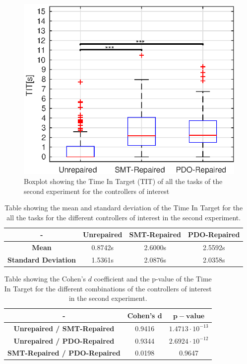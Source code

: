 \begin{figure}[H]
    \centering
    \includegraphics[width=\textwidth]{Images/second-experiment/exp1_TIT.eps}
    \caption{Boxplot showing the Time In Target (TIT) of all the tasks of the second experiment for the controllers of interest}
    \label{fig:box-TIT-all-second}
\end{figure}
\begin{table}[H]
    \centering
    \begin{tabular}{|c|c|c|c|}
        \hline
        - & \textbf{Unrepaired} & \textbf{SMT-Repaired} & \textbf{PDO-Repaired} \\
        \hline
        \textbf{Mean} & 0.8742s & 2.6000s & 2.5592s \\
        \textbf{Standard Deviation} & 1.5361s & 2.0876s & 2.0358s \\
        \hline
    \end{tabular}
    \caption{Table showing the mean and standard deviation of the Time In Target for the all the tasks for the different controllers of interest in the second experiment.}
    \label{tab:TIT-all-second-mean-std}
\end{table}
\begin{table}[H]
    \centering
    \begin{tabular}{|c|c|c|}
        \hline
        - & \textbf{Cohen's} $\mathbf{d}$ & $\mathbf{p-value}$ \\
        \hline
        \textbf{Unrepaired / SMT-Repaired} & 0.9416 & $1.4713 \cdot 10^{-13}$ \\
        \textbf{Unrepaired / PDO-Repaired} & 0.9344 & $2.6924 \cdot 10^{-12}$ \\
        \textbf{SMT-Repaired / PDO-Repaired} & 0.0198 & 0.9647 \\
        \hline
    \end{tabular}
    \caption{Table showing the Cohen's $d$ coefficient and the p-value of the Time In Target for the different combinations of the controllers of interest in the second experiment.}
    \label{tab:TIT-all-second-cohen-p}
\end{table}
%
%
%
%
%
